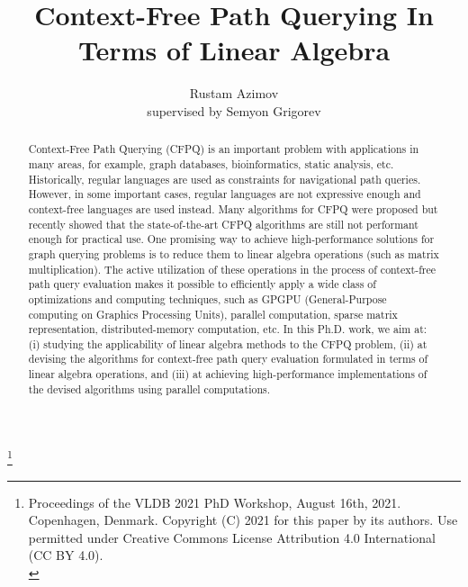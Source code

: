\documentclass[sigconf, nonacm]{acmart}
\newcommand\vldbdoi{XX.XX/XXX.XX}
\newcommand\vldbpages{XXX-XXX}
\newcommand\vldbvolume{14}
\newcommand\vldbissue{1}
\newcommand\vldbyear{2021}
\newcommand\vldbauthors{\authors}
\newcommand\vldbtitle{\shorttitle}
\newcommand\vldbpagestyle{plain}
\begin{document}
\title{Context-Free Path Querying In Terms of Linear Algebra}

\author{Rustam Azimov \\ supervised by Semyon Grigorev} 

\begin{abstract}
Context-Free Path Querying (CFPQ) is an important problem with applications in many areas, for example, graph databases, bioinformatics, static analysis, etc. Historically, regular languages are used as constraints for
navigational path queries. However, in some important cases, regular languages are not expressive enough and context-free languages are used instead. Many algorithms for CFPQ were proposed but recently showed
that the state-of-the-art CFPQ algorithms are still not performant enough for practical use. One promising way to achieve
high-performance solutions for graph querying problems is to
reduce them to linear algebra operations (such as matrix
multiplication). The active utilization of these operations in the process of context-free path query evaluation
makes it possible to efficiently apply a wide class of optimizations
and computing techniques, such as GPGPU (General-Purpose computing on Graphics Processing Units), parallel computation, sparse
matrix representation, distributed-memory computation, etc. In this Ph.D. work, we aim at: (i) studying the applicability of linear algebra methods to the CFPQ problem, (ii) at devising the algorithms for context-free path query evaluation formulated in terms of linear algebra operations, and (iii) at achieving high-performance implementations of the devised algorithms using parallel computations.
\end{abstract}

\maketitle

\pagestyle{\vldbpagestyle}
\begingroup
\renewcommand\thefootnote{}\footnote{\noindent
	Proceedings of the VLDB 2021 PhD Workshop, August 16th, 2021. Copenhagen, Denmark. Copyright (C) 2021 for this paper by its authors. Use permitted under Creative Commons License Attribution 4.0 International (CC BY 4.0).\\
}\addtocounter{footnote}{-1}\endgroup
\end{document}
